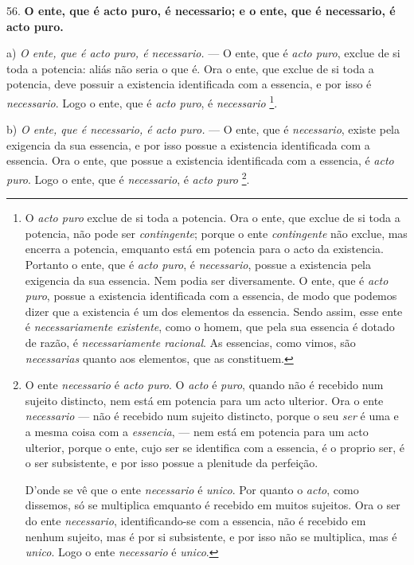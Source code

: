 56. \textbf{O ente, que é acto puro, é necessario; e o ente, que é necessario, é acto puro.}

a) \emph{O ente, que é acto puro, é necessario.} --- O ente, que é \emph{acto puro}, exclue de si toda a potencia: aliás não seria o que é. Ora o ente, que exclue de si toda a potencia, deve possuir a existencia identificada com a essencia, e por isso é \emph{necessario}. Logo o ente, que é \emph{acto puro}, é \emph{necessario} \footnote{O \emph{acto puro} exclue de si toda a potencia. Ora o ente, que exclue de si toda a potencia, não pode ser \emph{contingente}; porque o ente \emph{contingente} não exclue, mas encerra a potencia, emquanto está em potencia para o acto da existencia. Portanto o ente, que é \emph{acto puro}, é \emph{necessario}, possue a existencia pela exigencia da sua essencia. Nem podia ser diversamente. O ente, que é \emph{acto puro}, possue a existencia identificada com a essencia, de modo que podemos dizer que a existencia é um dos elementos da essencia. Sendo assim, esse ente é \emph{necessariamente existente}, como o homem, que pela sua essencia é dotado de razão, é \emph{necessariamente racional}. As essencias, como vimos, são \emph{necessarias} quanto aos elementos, que as constituem.}.

b) \emph{O ente, que é necessario, é acto puro.} --- O ente, que é \emph{necessario}, existe pela exigencia da sua essencia, e por isso possue a existencia identificada com a essencia. Ora o ente, que possue a existencia identificada com a essencia, é \emph{acto puro}. Logo o ente, que é \emph{necessario}, é \emph{acto puro} \footnote{O ente \emph{necessario} é \emph{acto puro}. O \emph{acto} é \emph{puro}, quando não é recebido num sujeito distincto, nem está em potencia para um acto ulterior. Ora o ente \emph{necessario} --- não é recebido num sujeito distincto, porque o seu \emph{ser} é uma e a mesma coisa com a \emph{essencia}, --- nem está em potencia para um acto ulterior, porque o ente, cujo ser se identifica com a essencia, é o proprio ser, é o ser subsistente, e por isso possue a plenitude da perfeição.\par D'onde se vê que o ente \emph{necessario} é \emph{unico}. Por quanto o \emph{acto}, como dissemos, só se multiplica emquanto é recebido em muitos sujeitos. Ora o ser do ente \emph{necessario}, identificando-se com a essencia, não é recebido em nenhum sujeito, mas é por si subsistente, e por isso não se multiplica, mas é \emph{unico}. Logo o ente \emph{necessario} é \emph{unico}.}.

